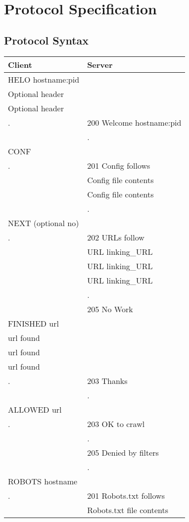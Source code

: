 \chapter{Protocol Specification}\label{appndx-protocol}
\section{Protocol Syntax}
\begin{center}

\begin{supertabular}{|l|l|}
\hline
\bf{Client} & \bf{Server} \\
\hline
HELO hostname:pid & \\
Optional header& \\
Optional header& \\
. & 200 Welcome hostname:pid \\
& .\\
\hline
CONF &\\
. & 201 Config follows\\
& Config file contents\\
& Config file contents\\
&.\\
\hline
NEXT (optional no) &\\
. & 202 URLs follow\\
& URL linking\_URL\\
& URL linking\_URL\\
& URL linking\_URL\\
&.\\
&205 No Work \\
\hline
FINISHED url & \\
url found &\\
url found &\\
url found &\\
.&203 Thanks\\
&.\\
\hline
ALLOWED url &\\
.&203 OK to crawl\\
&.\\
&205 Denied by filters\\
&.\\
\hline
ROBOTS hostname &\\
.& 201 Robots.txt follows\\
&Robots.txt file contents\\

\end{supertabular}
\end{center}
